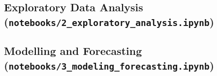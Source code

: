 \documentclass[12pt]{article}
\begin{document}


\subsection{Exploratory Data Analysis (\texttt{notebooks/2\_exploratory\_analysis.ipynb})}



\subsection{Modelling and Forecasting (\texttt{notebooks/3\_modeling\_forecasting.ipynb})}


\end{document}
